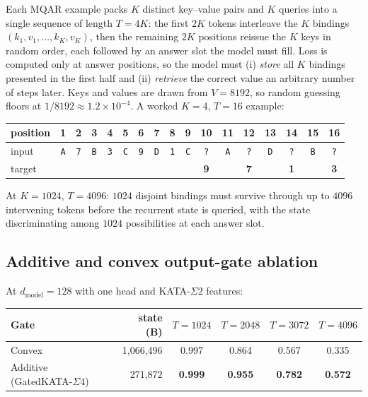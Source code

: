 \documentclass{article}
\newcommand{\1}{\bm{1}}
\newcommand{\seql}{T}
\theoremstyle{definition}
\begin{document}
Each MQAR example packs $K$ distinct key--value pairs and $K$ queries into a single sequence of
length $\seql=4K$: the first $2K$ tokens interleave the $K$ bindings $(k_1,v_1,\dots,k_K,v_K)$, then
the remaining $2K$ positions reissue the $K$ keys in random order, each followed by an answer slot
the model must fill. Loss is computed only at answer positions, so the model must (i) \emph{store}
all $K$ bindings presented in the first half and (ii) \emph{retrieve} the correct value an
arbitrary number of steps later. Keys and values are drawn from $V=8192$, so random guessing floors
at $1/8192\approx 1.2\!\times\!10^{-4}$. A worked $K{=}4$, $\seql{=}16$ example:
\begin{center}\footnotesize
  \begin{tabular}{l|cccccccc|cccccccc}
    position & 1          & 2          & 3          & 4          & 5          & 6          & 7          & 8          & 9 & 10         & 11 & 12         & 13 & 14         & 15 & 16         \\
    \midrule
    input    & \texttt{A} & \texttt{7} & \texttt{B} & \texttt{3} & \texttt{C} & \texttt{9} & \texttt{D} & \texttt{1}
             & \texttt{C} & \texttt{?} & \texttt{A} & \texttt{?} & \texttt{D} & \texttt{?} & \texttt{B} & \texttt{?}                                                                        \\
    target   &            &            &            &            &            &            &            &            &   & \textbf{9} &    & \textbf{7} &    & \textbf{1} &    & \textbf{3} \\
  \end{tabular}
\end{center}
At $K{=}1024$, $\seql{=}4096$: $1024$ disjoint bindings must survive through up to $4096$
intervening tokens before the recurrent state is queried, with the state discriminating among
$1024$ possibilities at each answer slot.

\subsection{Additive and convex output-gate ablation}

At $d_\text{model}{=}128$ with one head and KATA-$\Sigma2$ features:

\begin{center}\footnotesize
  \begin{tabular}{l|r|cccc}
    \toprule
    Gate                    & state (B)     & $\seql{=}1024$     & $\seql{=}2048$     & $\seql{=}3072$     & $\seql{=}4096$     \\
    \midrule
    Convex                  & 1{,}066{,}496 & 0.997          & 0.864          & 0.567          & 0.335          \\
    Additive (GatedKATA-$\Sigma4$) & 271{,}872     & \textbf{0.999} & \textbf{0.955} & \textbf{0.782} & \textbf{0.572} \\
    \bottomrule
  \end{tabular}
\end{center}
\end{document}
